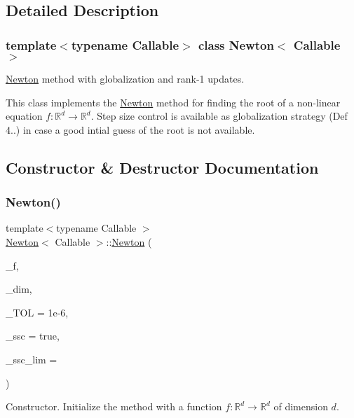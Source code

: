 \subsection{Detailed Description}
\subsubsection*{template$<$typename Callable$>$\newline
class Newton$<$ Callable $>$}

\hyperlink{classNewton}{Newton} method with globalization and rank-\/1 updates. 

This class implements the \hyperlink{classNewton}{Newton} method for finding the root of a non-\/linear equation $f:\mathbb{R}^d \rightarrow \mathbb{R}^d$. Step size control is available as globalization strategy (Def 4..) in case a good intial guess of the root is not available. 

\subsection{Constructor \& Destructor Documentation}
\mbox{\label{classNewton_a8271deaf4a7dd62152c126fb506b8d9b}} 
\subsubsection{\texorpdfstring{Newton()}{Newton()}}
{\footnotesize\ttfamily template$<$typename Callable $>$ \\
\hyperlink{classNewton}{Newton}$<$ Callable $>$\+::\hyperlink{classNewton}{Newton} (\begin{DoxyParamCaption}\item[{Callable}]{\+\_\+f,  }\item[{size\+\_\+t}]{\+\_\+dim,  }\item[{F\+P\+\_\+\+Type}]{\+\_\+\+T\+OL = {\ttfamily 1e-\/6},  }\item[{bool}]{\+\_\+ssc = {\ttfamily true},  }\item[{size\+\_\+t}]{\+\_\+ssc\+\_\+lim = {} }\end{DoxyParamCaption})\hspace{0.3cm}{\ttfamily [inline]}}



Constructor. Initialize the method with a function $f:\mathbb{R}^d \rightarrow \mathbb{R}^d$ of dimension $d$. 

